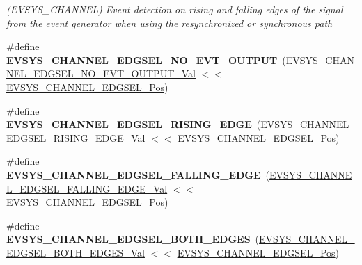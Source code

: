 \begin{DoxyCompactItemize}
\begin{DoxyCompactList}\small\item\em (E\+V\+S\+Y\+S\+\_\+\+C\+H\+A\+N\+N\+E\+L) Event detection on rising and falling edges of the signal from the event generator when using the resynchronized or synchronous path \end{DoxyCompactList}\item 
\hypertarget{group___s_a_m_l21___e_v_s_y_s_ga700eb99d5080fdf2d9c8a3302bd33ffc}{}\#define {\bfseries E\+V\+S\+Y\+S\+\_\+\+C\+H\+A\+N\+N\+E\+L\+\_\+\+E\+D\+G\+S\+E\+L\+\_\+\+N\+O\+\_\+\+E\+V\+T\+\_\+\+O\+U\+T\+P\+U\+T}~(\hyperlink{group___s_a_m_l21___e_v_s_y_s_ga80b0403aa00907e545ba1ce27a55b03a}{E\+V\+S\+Y\+S\+\_\+\+C\+H\+A\+N\+N\+E\+L\+\_\+\+E\+D\+G\+S\+E\+L\+\_\+\+N\+O\+\_\+\+E\+V\+T\+\_\+\+O\+U\+T\+P\+U\+T\+\_\+\+Val} $<$$<$ \hyperlink{group___s_a_m_l21___e_v_s_y_s_ga940ccedfddf915a4532da9b752cab3a0}{E\+V\+S\+Y\+S\+\_\+\+C\+H\+A\+N\+N\+E\+L\+\_\+\+E\+D\+G\+S\+E\+L\+\_\+\+Pos})\label{group___s_a_m_l21___e_v_s_y_s_ga700eb99d5080fdf2d9c8a3302bd33ffc}

\item 
\hypertarget{group___s_a_m_l21___e_v_s_y_s_gae43987b4938ce70f9a0179873da5a558}{}\#define {\bfseries E\+V\+S\+Y\+S\+\_\+\+C\+H\+A\+N\+N\+E\+L\+\_\+\+E\+D\+G\+S\+E\+L\+\_\+\+R\+I\+S\+I\+N\+G\+\_\+\+E\+D\+G\+E}~(\hyperlink{group___s_a_m_l21___e_v_s_y_s_ga74f200244816d34ebcda294dfa39d163}{E\+V\+S\+Y\+S\+\_\+\+C\+H\+A\+N\+N\+E\+L\+\_\+\+E\+D\+G\+S\+E\+L\+\_\+\+R\+I\+S\+I\+N\+G\+\_\+\+E\+D\+G\+E\+\_\+\+Val} $<$$<$ \hyperlink{group___s_a_m_l21___e_v_s_y_s_ga940ccedfddf915a4532da9b752cab3a0}{E\+V\+S\+Y\+S\+\_\+\+C\+H\+A\+N\+N\+E\+L\+\_\+\+E\+D\+G\+S\+E\+L\+\_\+\+Pos})\label{group___s_a_m_l21___e_v_s_y_s_gae43987b4938ce70f9a0179873da5a558}

\item 
\hypertarget{group___s_a_m_l21___e_v_s_y_s_gaa1e192cf9b7b4fda29c8e37f1825e68d}{}\#define {\bfseries E\+V\+S\+Y\+S\+\_\+\+C\+H\+A\+N\+N\+E\+L\+\_\+\+E\+D\+G\+S\+E\+L\+\_\+\+F\+A\+L\+L\+I\+N\+G\+\_\+\+E\+D\+G\+E}~(\hyperlink{group___s_a_m_l21___e_v_s_y_s_gaea62b90832a5f319570b4fd0cdb884d5}{E\+V\+S\+Y\+S\+\_\+\+C\+H\+A\+N\+N\+E\+L\+\_\+\+E\+D\+G\+S\+E\+L\+\_\+\+F\+A\+L\+L\+I\+N\+G\+\_\+\+E\+D\+G\+E\+\_\+\+Val} $<$$<$ \hyperlink{group___s_a_m_l21___e_v_s_y_s_ga940ccedfddf915a4532da9b752cab3a0}{E\+V\+S\+Y\+S\+\_\+\+C\+H\+A\+N\+N\+E\+L\+\_\+\+E\+D\+G\+S\+E\+L\+\_\+\+Pos})\label{group___s_a_m_l21___e_v_s_y_s_gaa1e192cf9b7b4fda29c8e37f1825e68d}

\item 
\hypertarget{group___s_a_m_l21___e_v_s_y_s_gaf75e2b4ce7f76df0e12b9c83a36c1d0b}{}\#define {\bfseries E\+V\+S\+Y\+S\+\_\+\+C\+H\+A\+N\+N\+E\+L\+\_\+\+E\+D\+G\+S\+E\+L\+\_\+\+B\+O\+T\+H\+\_\+\+E\+D\+G\+E\+S}~(\hyperlink{group___s_a_m_l21___e_v_s_y_s_ga30ceae6c03e9e5fb6302f5f4d234599d}{E\+V\+S\+Y\+S\+\_\+\+C\+H\+A\+N\+N\+E\+L\+\_\+\+E\+D\+G\+S\+E\+L\+\_\+\+B\+O\+T\+H\+\_\+\+E\+D\+G\+E\+S\+\_\+\+Val} $<$$<$ \hyperlink{group___s_a_m_l21___e_v_s_y_s_ga940ccedfddf915a4532da9b752cab3a0}{E\+V\+S\+Y\+S\+\_\+\+C\+H\+A\+N\+N\+E\+L\+\_\+\+E\+D\+G\+S\+E\+L\+\_\+\+Pos})\label{group___s_a_m_l21___e_v_s_y_s_gaf75e2b4ce7f76df0e12b9c83a36c1d0b}


\end{DoxyCompactItemize}
